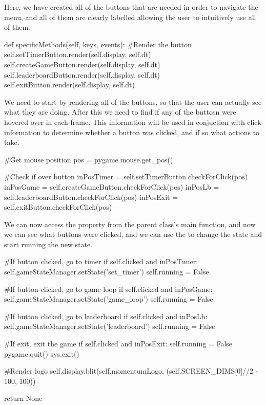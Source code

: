 Here, we have created all of the buttons that are needed in order to navigate the menu, and all of them are clearly labelled allowing the user to intuitively use all of them.

\begin{mpy}
    def specificMethods(self, keys, events):
        #Render the button
        self.setTimerButton.render(self.display, self.dt)
        self.createGameButton.render(self.display, self.dt)
        self.leaderboardButton.render(self.display, self.dt)
        self.exitButton.render(self.display, self.dt)
\end{mpy}
We need to start by rendering all of the buttons, so that the user can actually see what they are doing. After this we need to find if any of the buttosn were hovered over in each frame. This information will be used in conjuction with click information to determine whether a button was clicked, and if so what actions to take.

\begin{mpy}
        #Get mouse position
        pos = pygame.mouse.get_pos()

        #Check if over button
        inPosTimer = self.setTimerButton.checkForClick(pos)
        inPosGame = self.createGameButton.checkForClick(pos)
        inPosLb = self.leaderboardButton.checkForClick(pos)
        inPosExit = self.exitButton.checkForClick(pos)
\end{mpy}

We can now access the  property from the  parent class's main  function, and now we can see what buttons were clicked, and we can use the  to change the state and start running the new state.

\begin{mpy}
        #If button clicked, go to timer
        if self.clicked and inPosTimer:
            self.gameStateManager.setState('set_timer')
            self.running = False

        #If button clicked, go to game loop
        if self.clicked and inPosGame:
            self.gameStateManager.setState('game_loop')
            self.running = False

        #If button clicked, go to leaderboard
        if self.clicked and inPosLb:
            self.gameStateManager.setState('leaderboard')
            self.running = False

        #If exit, exit the game
        if self.clicked and inPosExit:
            self.running = False
            pygame.quit()
            sys.exit()

        #Render logo
        self.display.blit(self.momentumLogo, (self.SCREEN_DIMS[0]//2 - 100, 100))
        
        return None
\end{mpy}

